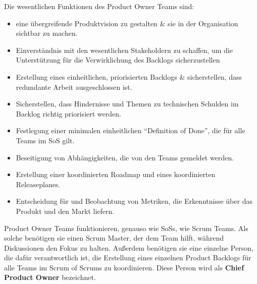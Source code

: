 \documentclass[12pt,a4paper,parskip=full]{scrartcl}
\begin{document}
Die wesentlichen Funktionen des Product Owner Teams sind:
\begin{itemize}
\item eine übergreifende Produktvision zu gestalten \& sie in der Organisation sichtbar zu machen.
\item Einverständnis mit den wesentlichen Stakeholdern zu schaffen, um die
Unterstützung für die Verwirklichung des Backlogs sicherzustellen
\item Erstellung eines einheitlichen, priorisierten Backlogs \& sicherstellen, dass
redundante Arbeit ausgeschlossen ist.
\item Sicherstellen, dass Hindernisse und Themen zu technischen Schulden im Backlog richtig priorisiert werden.
\item Festlegung einer minimalen einheitlichen ``Definition of Done'', die für alle Teams im SoS gilt.
\item Beseitigung von Abhängigkeiten, die von den Teams gemeldet werden.
\item Erstellung einer koordinierten Roadmap und eines koordinierten Releaseplanes.
\item Entscheidung für und Beobachtung von Metriken, die Erkenntnisse über das Produkt und den Markt liefern.
\end{itemize}
Product Owner Teams funktionieren, genauso wie SoSs, wie Scrum Teams. Als solche
benötigen sie einen Scrum Master, der dem Team hilft, während Diskussionen den Fokus zu halten.
Außerdem benötigen sie eine einzelne Person, die dafür verantwortlich ist,
die Erstellung eines einzelnen Product Backlogs für alle Teams im Scrum of Scrums
zu koordinieren. Diese Person wird als \textbf{Chief Product Owner} bezeichnet.
\end{document}
